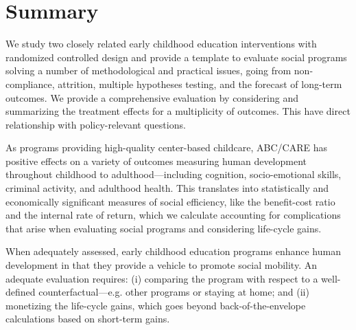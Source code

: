 \section{Summary} \label{section:conclusion}

We study two closely related early childhood education interventions with randomized controlled design and provide a template to evaluate social programs solving a number of methodological and practical issues, going from non-compliance, attrition, multiple hypotheses testing, and the forecast of long-term outcomes. We provide a comprehensive evaluation by considering and summarizing the treatment effects for a multiplicity of outcomes. This have direct relationship with policy-relevant questions.

As programs providing high-quality center-based childcare, ABC/CARE has positive effects on a variety of outcomes measuring human development throughout childhood to adulthood---including cognition, socio-emotional skills, criminal activity, and adulthood health. This translates into statistically and economically significant measures of social efficiency, like the benefit-cost ratio and the internal rate of return, which we calculate accounting for complications that arise when evaluating social programs and considering life-cycle gains.

When adequately assessed, early childhood education programs enhance human development in that they provide a vehicle to promote social mobility. An adequate evaluation requires: (i) comparing the program with respect to a well-defined counterfactual---e.g. other programs or staying at home; and (ii) monetizing the life-cycle gains, which goes beyond back-of-the-envelope calculations based on short-term gains.

\singlespace



 